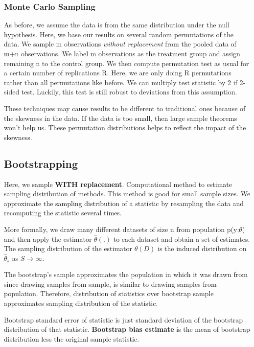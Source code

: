 \documentclass[11pt, oneside]{article}
\theoremstyle{definition}
\begin{document}
\subsubsection{Monte Carlo Sampling}
As before, we assume the data is from the same distribution under the null hypothesis. Here, we base our results on several random permutations of the data. We sample m observations \textit{without replacement} from the pooled data of m+n observations. We label m observations as the treatment group and assign remaining n to the control group. We then compute permutation test as usual for a certain number of replications R. Here, we are only doing R permutations rather than all permutations like before. We can multiply test statistic by 2 if 2-sided test. Luckily, this test is still robust to deviations from this assumption.

These techniques may cause results to be different to traditional ones because of the skewness in the data. If the data is too small, then large sample theorems won't help us. These permutation distributions helps to reflect the impact of the skewness.

\subsection{Bootstrapping}
Here, we sample \textbf{WITH replacement}. Computational method to estimate sampling distribution of methods. This method is good for small sample sizes. We approximate the sampling distribution of a statistic by resampling the data and recomputing the statistic several times.

More formally, we draw many different datasets of size n from population p(y;$\theta$) and then apply the estimator $\hat{\theta}(.)$ to each dataset and obtain a set of estimates. The sampling distribution of the estimator $\hat{\theta}(D)$ is the induced distribution on $\hat{\theta}_s$ as $S \rightarrow \infty$.

The bootstrap's sample approximates the population in which it was drawn from since drawing samples from sample, is similar to drawing samples from population. Therefore, distribution of statistics over bootstrap sample approximates sampling distribution of the statistic.

Bootstrap standard error of statistic is just standard deviation of the bootstrap distribution of that statistic. \textbf{Bootstrap bias estimate} is the mean of bootstrap distribution less the original sample statistic.
\end{document}
